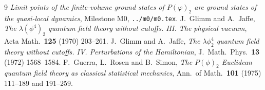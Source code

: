 \documentclass[11pt,a4paper]{article}
\theoremstyle{plain}
\theoremstyle{definition}
\begin{document}
\begin{thebibliography}{9}
 \emph{Limit points of the finite-volume ground states of $P(\varphi)_2$ are ground
states of the quasi-local dynamics}, Milestone M0, \texttt{../m0/m0.tex}.
 J.~Glimm and A.~Jaffe, \emph{The $\lambda(\phi^4)_2$ quantum field theory without
cutoffs. III. The physical vacuum}, Acta Math.\ \textbf{125} (1970) 203--261.
 J.~Glimm and A.~Jaffe, \emph{The $\lambda\phi^4_2$ quantum field theory without
cutoffs. IV. Perturbations of the Hamiltonian}, J.\ Math.\ Phys.\ \textbf{13} (1972) 1568--1584.
 F.~Guerra, L.~Rosen and B.~Simon, \emph{The $P(\phi)_2$ Euclidean quantum field
theory as classical statistical mechanics}, Ann.\ of Math.\ \textbf{101} (1975) 111--189 and
191--259.
\end{thebibliography}
\end{document}
